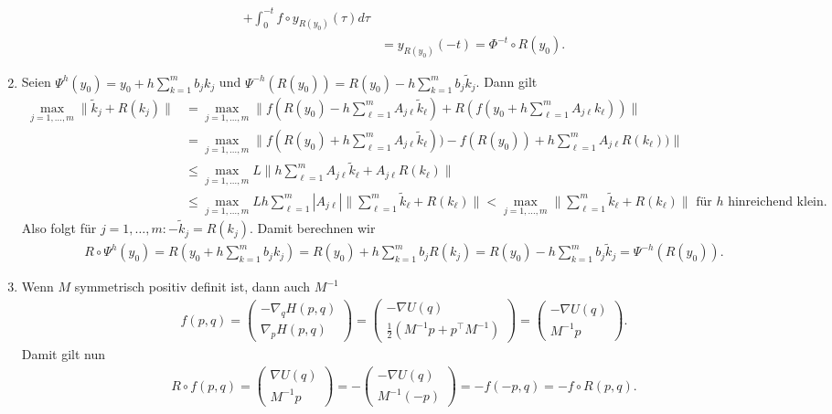 \begin{solution}
\begin{enumerate}[label = \textbf{\alph*)}]
\begin{align*}
      + \int_0^{-t} f\circ y_{R(y_0)}(\tau) d\tau \\
      &= y_{R(y_0)}(-t) = \Phi^{-t} \circ R(y_0).
    \end{align*}
  \item
  Seien $\Psi^h(y_0) = y_0 + h\sum_{k=1}^mb_jk_j$ und $\Psi^{-h}(R(y_0)) = R(y_0) - h\sum_{k=1}^mb_j\widetilde{k}_j$.
  Dann gilt
  \begin{align*}
    \max_{j=1,\dots,m}\|\widetilde{k}_j + R(k_j)\| &= \max_{j=1,\dots,m}
    \|f(R(y_0) - h\sum_{\ell = 1}^m A_{j\ell}\widetilde{k}_{\ell}) +
    R(f(y_0 + h\sum_{\ell = 1}^m A_{j\ell}k_{\ell}))\| \\
    &= \max_{j=1,\dots,m}\|f(R(y_0) + h\sum_{\ell = 1}^m A_{j\ell}\widetilde{k}_{\ell}))
    - f(R(y_0)) + h\sum_{\ell = 1}^m A_{j\ell}R(k_{\ell}))\| \\
    &\leq \max_{j=1,\dots,m}L\|h\sum_{\ell = 1}^m A_{j\ell}\widetilde{k}_{\ell} + A_{j\ell}R(k_{\ell})\| \\
    &\leq \max_{j=1,\dots,m}Lh\sum_{\ell = 1}^m |A_{j\ell}|\|\sum_{\ell = 1}^m\widetilde{k}_{\ell} + R(k_{\ell})\|
    < \max_{j=1,\dots,m}\|\sum_{\ell = 1}^m\widetilde{k}_{\ell} + R(k_{\ell})\| \text{ für $h$ hinreichend klein.}
  \end{align*}
  Also folgt für $j = 1,\dots,m: -\widetilde{k}_j = R(k_j)$. Damit berechnen wir
  \begin{align*}
    R \circ \Psi^h(y_0) = R(y_0 + h\sum_{k=1}^mb_jk_j)
    = R(y_0) + h\sum_{k=1}^mb_jR(k_j) = R(y_0) - h\sum_{k=1}^mb_j\widetilde{k}_j
    = \Psi^{-h}(R(y_0)).
  \end{align*}
  \item Wenn $M$ symmetrisch positiv definit ist, dann auch $M^{-1}$
  \begin{align*}
    f(p,q) = \begin{pmatrix}
      -\nabla_q H(p,q) \\ \nabla_p H(p,q)
    \end{pmatrix}
    = \begin{pmatrix}
      -\nabla U(q) \\ \frac{1}{2}(M^{-1}p + p^{\top}M^{-1})
    \end{pmatrix}
    = \begin{pmatrix}
      -\nabla U(q) \\ M^{-1}p
    \end{pmatrix}.
  \end{align*}
  Damit gilt nun
  \begin{align*}
    R\circ f (p,q) = \begin{pmatrix}
      \nabla U(q) \\ M^{-1}p
    \end{pmatrix}
    = - \begin{pmatrix}
      -\nabla U(q) \\ M^{-1}(-p)
    \end{pmatrix}
    = -f(-p,q) = -f\circ R(p,q).
  \end{align*}
\end{enumerate}

\end{solution}
